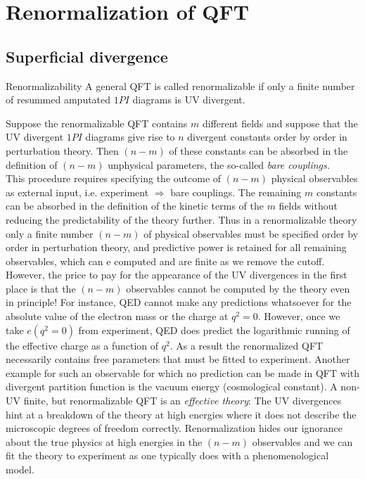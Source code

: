 \newpage

\section{Renormalization of QFT}

\subsection{Superficial divergence}
\begin{mybox}{Renormalizability}
	A general QFT is called renormalizable if only a finite number of resummed amputated $1PI$ diagrams is UV divergent.
\end{mybox}
Suppose the renormalizable QFT contains $m$ different fields and suppose that the UV divergent $1PI$ diagrams give rise to $n$ divergent constants order by order in perturbation theory. Then $(n-m)$ of these constants can be absorbed in the definition of $(n-m)$ unphysical parameters, the so-called \emph{bare couplings.}\\
This procedure requires specifying the outcome of $(n-m)$ physical observables as external input, i.e. experiment $\Rightarrow$ bare couplings. The remaining $m$ constants can be absorbed in the definition of the kinetic terms of the $m$ fields without reducing the predictability of the theory further. Thus in a renormalizable theory only a finite number $(n-m)$ of physical observables must be specified order by order in perturbation theory, and predictive power is retained for all remaining observables, which can e computed and are finite as we remove the cutoff.\\
However, the price to pay for the appearance of the UV divergences in the first place is that the $(n-m)$ observables cannot be computed by the theory even in principle! For instance, QED cannot make any predictions whatsoever for the absolute value of the electron mass or the charge at $q^2=0$. However, once we take $e(q^2=0)$ from experiment, QED does predict the logarithmic running of the effective charge as a function of $q^2$. As a result the renormalized QFT necessarily contains free parameters that must be fitted to experiment. Another example for such an observable for which no prediction can be made in QFT with divergent partition function is the vacuum energy (cosmological constant). A non-UV finite, but renormalizable QFT is an \emph{effective theory}: The UV divergences hint at a breakdown of the theory at high energies where it does not describe the microscopic degrees of freedom correctly. Renormalization hides our ignorance about the true physics at high energies in the $(n-m)$ observables and we can fit the theory to experiment as one typically does with a phenomenological model.

